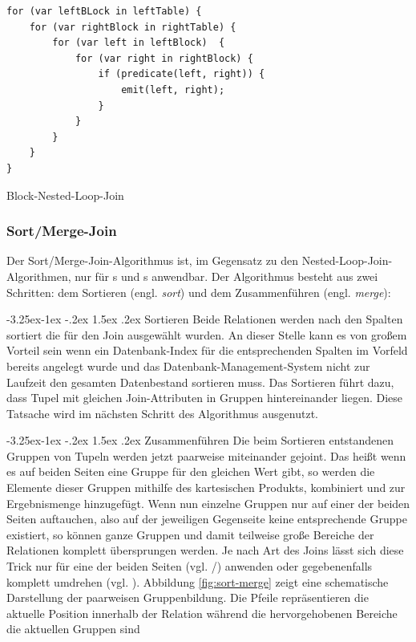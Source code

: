 \documentclass[a4paper]{article}
\makeatletter
\renewcommand\paragraph{\@startsection{paragraph}{4}{\z@}%
  {-3.25ex\@plus -1ex \@minus -.2ex}%
  {1.5ex \@plus .2ex}%
  {\normalfont\normalsize\bfseries}}
\makeatother
\begin{document}
\begin{listing}[H]
\begin{verbatim}
for (var leftBLock in leftTable) {
    for (var rightBlock in rightTable) {
        for (var left in leftBlock)  {
            for (var right in rightBlock) {
                if (predicate(left, right)) {
                    emit(left, right);
                }
            }
        }
    }
}
\end{verbatim}
\caption{Block-Nested-Loop-Join}
\label{lst:block-nested-loop}
\end{listing}

\newpage
\subsubsection{Sort/Merge-Join}
Der Sort/Merge-Join-Algorithmus ist, im Gegensatz zu den Nested-Loop-Join-Algorithmen, nur für s und s anwendbar. Der Algorithmus besteht aus zwei Schritten: dem Sortieren (engl. \textit{sort}) und dem Zusammenführen (engl. \textit{merge}):

\paragraph{Sortieren}
Beide Relationen werden nach den Spalten sortiert die für den Join ausgewählt wurden. An dieser Stelle kann es von großem Vorteil sein wenn ein Datenbank-Index für die entsprechenden Spalten im Vorfeld bereits angelegt wurde und das Datenbank-Management-System nicht zur Laufzeit den gesamten Datenbestand sortieren muss. Das Sortieren führt dazu, dass Tupel mit gleichen Join-Attributen in Gruppen hintereinander liegen. Diese Tatsache wird im nächsten Schritt des Algorithmus ausgenutzt.

\paragraph{Zusammenführen}
Die beim Sortieren entstandenen Gruppen von Tupeln werden jetzt paarweise miteinander gejoint. Das heißt wenn es auf beiden Seiten eine Gruppe für den gleichen Wert gibt, so werden die Elemente dieser Gruppen mithilfe des kartesischen Produkts, kombiniert und zur Ergebnismenge hinzugefügt. Wenn nun einzelne Gruppen nur auf einer der beiden Seiten auftauchen, also auf der jeweiligen Gegenseite keine entsprechende Gruppe existiert, so können ganze Gruppen und damit teilweise große Bereiche der Relationen komplett übersprungen werden. Je nach Art des Joins lässt sich diese Trick nur für eine der beiden Seiten (vgl. /) anwenden oder gegebenenfalls komplett umdrehen (vgl. ). Abbildung \ref{fig:sort-merge} zeigt eine schematische Darstellung der paarweisen Gruppenbildung. Die Pfeile repräsentieren die aktuelle Position innerhalb der Relation während die hervorgehobenen Bereiche die aktuellen Gruppen sind
\end{document}
